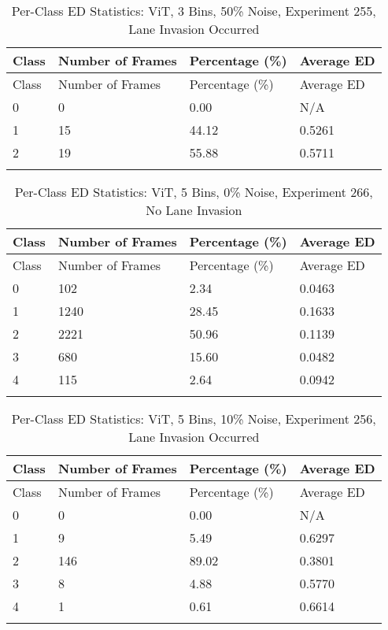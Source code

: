 
\begin{longtable}{@{}llll@{}}
\toprule
Class & Number of Frames & Percentage (\%) & Average ED \\
\midrule
\endfirsthead
\toprule
Class & Number of Frames & Percentage (\%) & Average ED \\
\midrule
\endhead
0 & 0 & 0.00 & N/A \\
1 & 15 & 44.12 & 0.5261 \\
2 & 19 & 55.88 & 0.5711 \\
\bottomrule
\caption{Per-Class ED Statistics: ViT, 3 Bins, 50\% Noise, Experiment 255, Lane Invasion Occurred}
\label{tab:exp255_ViT_3bins_50noise}
\end{longtable}
        


\begin{longtable}{@{}llll@{}}
\toprule
Class & Number of Frames & Percentage (\%) & Average ED \\
\midrule
\endfirsthead
\toprule
Class & Number of Frames & Percentage (\%) & Average ED \\
\midrule
\endhead
0 & 102 & 2.34 & 0.0463 \\
1 & 1240 & 28.45 & 0.1633 \\
2 & 2221 & 50.96 & 0.1139 \\
3 & 680 & 15.60 & 0.0482 \\
4 & 115 & 2.64 & 0.0942 \\
\bottomrule
\caption{Per-Class ED Statistics: ViT, 5 Bins, 0\% Noise, Experiment 266, No Lane Invasion}
\label{tab:exp266_ViT_5bins_0noise}
\end{longtable}
        


\begin{longtable}{@{}llll@{}}
\toprule
Class & Number of Frames & Percentage (\%) & Average ED \\
\midrule
\endfirsthead
\toprule
Class & Number of Frames & Percentage (\%) & Average ED \\
\midrule
\endhead
0 & 0 & 0.00 & N/A \\
1 & 9 & 5.49 & 0.6297 \\
2 & 146 & 89.02 & 0.3801 \\
3 & 8 & 4.88 & 0.5770 \\
4 & 1 & 0.61 & 0.6614 \\
\bottomrule
\caption{Per-Class ED Statistics: ViT, 5 Bins, 10\% Noise, Experiment 256, Lane Invasion Occurred}
\label{tab:exp256_ViT_5bins_10noise}
\end{longtable}
        

